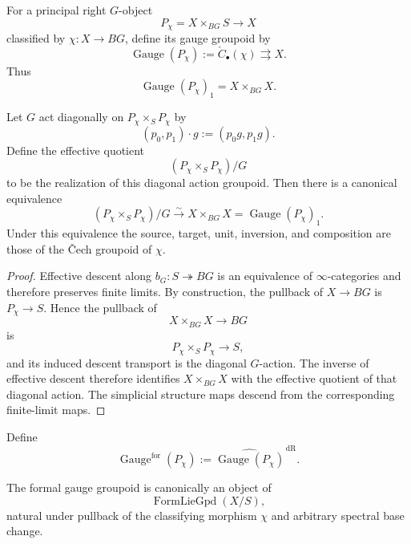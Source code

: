 \begin{definition}
\label{def:gauge-groupoid}
For a principal right $G$-object
\[
    P_\chi=X\times_{BG}S\longrightarrow X
\]
classified by $\chi:X\to BG$, define its gauge groupoid by
\[
    \operatorname{Gauge}(P_\chi)
    :=
    \check C_\bullet(\chi)
    \rightrightarrows X.
\]
Thus
\[
    \operatorname{Gauge}(P_\chi)_1
    =
    X\times_{BG}X.
\]
\end{definition}

\begin{proposition}
\label{prop:gauge-arrow-quotient}
Let $G$ act diagonally on $P_\chi\times_SP_\chi$ by
\[
    (p_0,p_1)\cdot g:=(p_0g,p_1g).
\]
Define the effective quotient
\[
    (P_\chi\times_SP_\chi)/G
\]
to be the realization of this diagonal action groupoid.  Then there is a
canonical equivalence
\[
    (P_\chi\times_SP_\chi)/G
    \xrightarrow{\sim}
    X\times_{BG}X
    =
    \operatorname{Gauge}(P_\chi)_1.
\]
Under this equivalence the source, target, unit, inversion, and composition
are those of the \v{C}ech groupoid of $\chi$.
\end{proposition}

\begin{proof}
Effective descent along $b_G:S\twoheadrightarrow BG$ is an equivalence of
$\infty$-categories and therefore preserves finite limits.  By construction,
the pullback of $X\to BG$ is $P_\chi\to S$.  Hence the pullback of
\[
    X\times_{BG}X\longrightarrow BG
\]
is
\[
    P_\chi\times_SP_\chi\longrightarrow S,
\]
and its induced descent transport is the diagonal $G$-action.  The inverse of
effective descent therefore identifies $X\times_{BG}X$ with the effective
quotient of that diagonal action.  The simplicial structure maps descend from
the corresponding finite-limit maps.
\end{proof}

\begin{definition}
\label{def:formal-gauge-groupoid}
Define
\[
    \operatorname{Gauge}^{\mathrm{for}}(P_\chi)
    :=
    \widehat{\operatorname{Gauge}(P_\chi)}^{\,\mathrm{dR}}.
\]
\end{definition}

\begin{proposition}
\label{prop:gauge-formal-lie-groupoid}
The formal gauge groupoid is canonically an object of
\[
    \operatorname{FormLieGpd}(X/S),
\]
natural under pullback of the classifying morphism $\chi$ and arbitrary
spectral base change.
\end{proposition}

